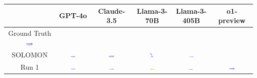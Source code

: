 \begin{table}[H]
    \centering
    \begin{tabular}{|c|c|c|c|c|c|}
    \hline
    & GPT-4o & Claude-3.5 & Llama-3-70B & Llama-3-405B & o1-preview \\
    \hline
    Ground Truth {\includegraphics[width=0.15\textwidth]{examples_png/Arrow.png}} & & & & &  \\
    \hline
    SOLOMON & \includegraphics[width=0.15\textwidth]{./pool_all/png/gpt-4o_results/Arrow.png} & \includegraphics[width=0.15\textwidth]{./pool_all/png/claude-3-5-sonnet-20240620_results/Arrow.png} & \includegraphics[width=0.15\textwidth]{./pool_all/png/watsonx_meta-llama_llama-3-1-70b-instruct_results/Arrow.png} & \includegraphics[width=0.15\textwidth]{./pool_all/png/watsonx_meta-llama_llama-3-405b-instruct_results/Arrow.png} & \\
    \hline
    Run 1 & \includegraphics[width=0.15\textwidth]{./run_1/png/gpt-4o_results/Arrow.png} & \includegraphics[width=0.15\textwidth]{./run_1/png/claude-3-5-sonnet-20240620_results/Arrow.png} & \includegraphics[width=0.15\textwidth]{./run_1/png/watsonx_meta-llama_llama-3-1-70b-instruct_results/Arrow.png} & \includegraphics[width=0.15\textwidth]{./run_1/png/watsonx_meta-llama_llama-3-405b-instruct_results/Arrow.png} & \includegraphics[width=0.15\textwidth]{./run_1/png/o1-preview_results/Arrow.png} \\

\end{tabular}
\end{table}
